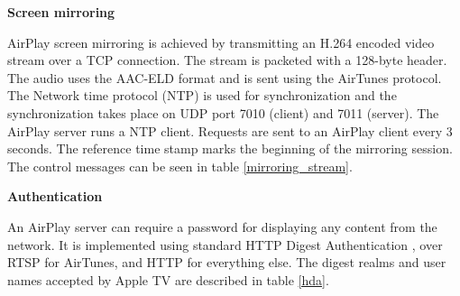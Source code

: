 \textbf{Screen mirroring}

AirPlay screen mirroring is achieved by transmitting an H.264 encoded video stream 
over a TCP connection. The stream is packeted with a
128-byte header. The audio uses the AAC-ELD format and is sent using the AirTunes protocol. 
The Network time protocol (NTP) \cite{ntp_rfc} is used for synchronization and
the synchronization takes place on UDP port 7010 (client) and 7011 (server). The 
AirPlay server runs a NTP client. Requests are sent to an AirPlay client every 3 
seconds. The reference time stamp marks the beginning of the 
mirroring session. The control messages can be seen in table 
\ref{mirroring_stream}.

\begin{table}[htb] 
\caption{AirPlay Mirroring Control HTTP requests \label{mirroring_stream}} 
\begin{center} 
\end{center} 
\end{table} 

\textbf{Authentication}

An AirPlay server can require a password for displaying any content from the 
network. It is implemented using standard HTTP Digest Authentication
\cite{http_auth_rfc}, over RTSP \cite{rtsp_rfc} for AirTunes, and HTTP
\cite{http_rfc} for everything else.
The digest realms and user names accepted by Apple TV are described in table \ref{hda}. 

\begin{table}[htb] 
\caption{AirPlay HTTP Digest Authentication \label{hda}} 
\begin{center} 
\end{center} 
\end{table} 

